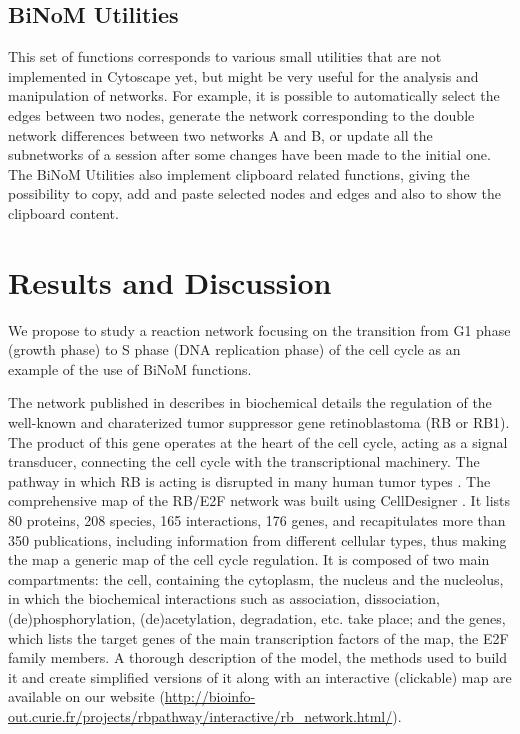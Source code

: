 \documentclass[10pt]{bmc_article}
\newenvironment{bmcformat}{\baselineskip20pt\sloppy\setboolean{publ}{false}}{\baselineskip20pt\sloppy}
\begin{document}
\begin{bmcformat}
\subsection*{BiNoM Utilities}
This set of functions corresponds to various small utilities that are not
implemented in Cytoscape yet, but might be very useful for the analysis and
manipulation of networks. For example, it is possible to automatically select
the edges between two nodes, generate the network corresponding to the double
network differences between two networks A and B, or update all the subnetworks of
a session after some changes have been made to the initial one. The BiNoM Utilities also implement
clipboard related functions, giving the possibility to copy, add and paste
selected nodes and edges and also to show the clipboard content. 


\section*{Results and Discussion}
We propose to study a reaction network focusing on the transition from G1 phase
(growth phase) to S phase (DNA replication phase) of the cell cycle
\cite{calzone2008comprehensive} as an example of the use of BiNoM functions. 

The network published in \cite{calzone2008comprehensive} describes in
biochemical details the regulation of the well-known and charaterized tumor
suppressor gene retinoblastoma (RB or RB1). The product of this gene operates at
the heart of the cell cycle, acting as a signal transducer, connecting the
cell cycle with the transcriptional machinery. The pathway in which RB is
acting is disrupted in many human tumor types \cite{weinberg1995retinoblastoma}.
The comprehensive map of the RB/E2F network was built using CellDesigner
\cite{funahashi2003celldesigner}. It lists 80 proteins, 208 species, 165
interactions, 176 genes, and recapitulates more than 350 publications, including
information from different cellular types, thus making the map a generic map of
the cell cycle regulation. It is composed of two main compartments: the cell,
containing the cytoplasm, the nucleus and the nucleolus, in which the
biochemical interactions such as association, dissociation, (de)phosphorylation,
(de)acetylation, degradation, etc. take place; and the genes, which lists the
target genes of the main transcription factors of the map, the E2F family
members.
A thorough description of the model, the methods used to build it and create
simplified versions of it along with an interactive (clickable) map are
available on our website
(\url{http://bioinfo-out.curie.fr/projects/rbpathway/interactive/rb_network.html/}).


\end{bmcformat}
\end{document}
